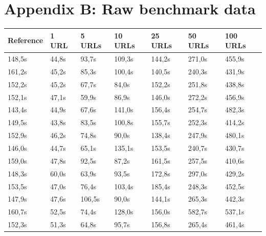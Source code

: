 \documentclass{scrartcl}
\begin{document}
\clearpage

\section*{Appendix B: Raw benchmark data}


\begin{table}[h]
\begin{tabular}{@{}lllllll@{}}
\toprule
Reference & 1 URL      & 5 URLs     & 10 URLs     & 25 URLs     & 50 URLs     & 100 URLs     \\ \midrule
148,5s    & 44,8s      & 93,7s      & 109,3s      & 144,2s      & 271,0s      & 455,9s       \\
161,2s    & 45,2s      & 85,3s      & 100,4s      & 140,5s      & 240,3s      & 431,9s       \\
152,2s    & 45,2s      & 67,7s      & 84,0s       & 152,2s      & 251,8s      & 438,8s       \\
152,1s    & 47,1s      & 59,9s      & 86,9s       & 146,0s      & 272,2s      & 456,9s       \\
143,4s    & 44,9s      & 67,6s      & 141,0s      & 156,4s      & 254,7s      & 482,3s       \\
149,5s    & 43,8s      & 83,5s      & 100,8s      & 155,7s      & 252,3s      & 414,2s       \\
152,9s    & 46,2s      & 74,8s      & 90,0s       & 138,4s      & 247,9s      & 480,1s       \\
146,0s    & 44,7s      & 65,1s      & 135,1s      & 153,5s      & 240,7s      & 430,7s       \\
159,0s    & 47,8s      & 92,5s      & 87,2s       & 161,5s      & 257,5s      & 410,6s       \\
148,3s    & 60,0s      & 63,9s      & 93,5s       & 172,8s      & 297,0s      & 429,2s       \\
153,5s    & 47,0s      & 76,4s      & 103,4s      & 185,4s      & 248,3s      & 452,5s       \\
147,9s    & 47,6s      & 106,5s     & 90,0s       & 144,1s      & 265,3s      & 442,3s       \\
160,7s    & 52,5s      & 74,4s      & 128,0s      & 156,0s      & 582,7s      & 537,1s       \\
152,3s    & 51,3s      & 64,8s      & 95,7s       & 156,8s      & 265,4s      & 461,4s       \\

\end{tabular}
\end{table}
\end{document}
